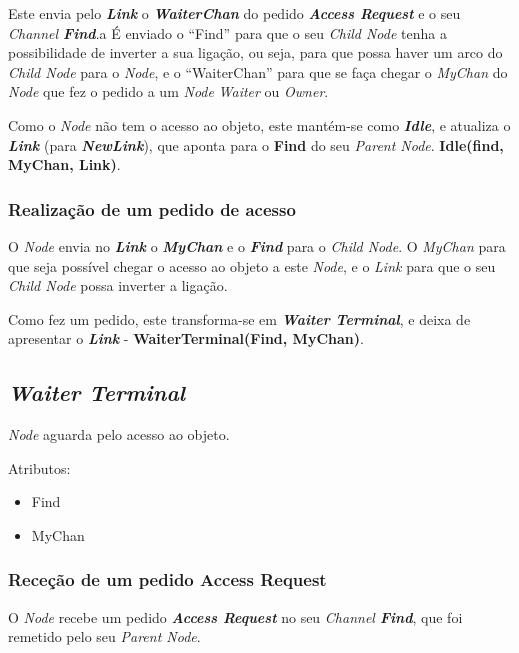 Este envia pelo \textbf{\emph{Link}} o \textbf{\emph{WaiterChan}} do pedido \emph{\textbf{Access Request}} e o seu \emph{Channel \textbf{Find}}.a
É enviado o ``Find'' para que o seu \emph{Child Node} tenha a possibilidade de inverter a sua ligação, ou seja, para que possa haver um arco do \emph{Child Node} para o \emph{Node}, 
e o ``WaiterChan'' para que se faça chegar o \emph{MyChan} do \emph{Node} que fez o pedido a um \emph{Node} \emph{Waiter} ou \emph{Owner}.

Como o \emph{Node} não tem o acesso ao objeto, este mantém-se como \emph{\textbf{Idle}}, e atualiza o \textbf{\emph{Link}} (para \textbf{\emph{NewLink}}), que aponta para o \textbf{Find} do seu \emph{Parent Node}.
\textbf{Idle(find, MyChan, Link)}.



\subsubsection*{Realização de um pedido de acesso}
O \emph{Node} envia no \textbf{\emph{Link}} o \textbf{\emph{MyChan}} e o \textbf{\emph{Find}} para o \emph{Child Node}.
O \emph{MyChan} para que seja possível chegar o acesso ao objeto a este \emph{Node}, e o \emph{Link} para que o seu \emph{Child Node} possa inverter a ligação.

Como fez um pedido, este transforma-se em \emph{\textbf{Waiter Terminal}}, e deixa de apresentar o \textbf{\emph{Link}} - \textbf{WaiterTerminal(Find, MyChan)}.

\subsection{\emph{Waiter Terminal}}
\label{especificacao:nodes:waiter_terminal}

\emph{Node} aguarda pelo acesso ao objeto.

Atributos:
\begin{itemize}
    \item Find
    \item MyChan
\end{itemize}

\subsubsection*{Receção de um pedido Access Request}
O \emph{Node} recebe um pedido \emph{\textbf{Access Request}} no seu \emph{Channel \textbf{Find}}, que foi remetido pelo seu \emph{Parent Node}.

